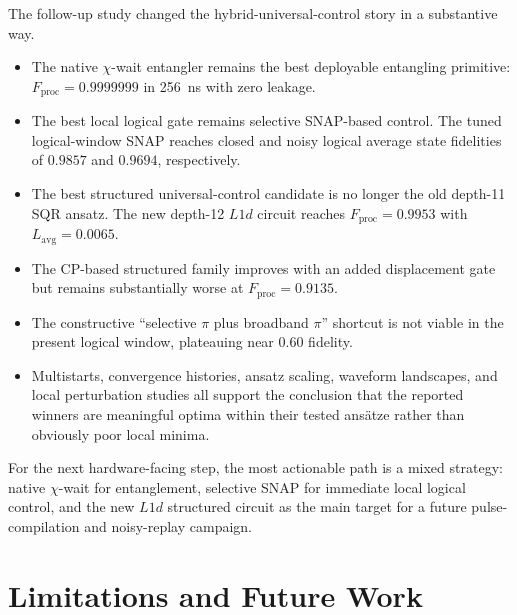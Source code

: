 \documentclass[11pt, a4paper]{article}
\begin{document}
The follow-up study changed the hybrid-universal-control story in a substantive way.
\begin{itemize}
\item The native $\chi$-wait entangler remains the best deployable entangling primitive: $F_{\mathrm{proc}} = 0.9999999$ in \SI{256}{ns} with zero leakage.
\item The best local logical gate remains selective SNAP-based control. The tuned logical-window SNAP reaches closed and noisy logical average state fidelities of $0.9857$ and $0.9694$, respectively.
\item The best structured universal-control candidate is no longer the old depth-11 SQR ansatz. The new depth-12 $L1d$ circuit reaches $F_{\mathrm{proc}} = 0.9953$ with $L_{\mathrm{avg}} = 0.0065$.
\item The CP-based structured family improves with an added displacement gate but remains substantially worse at $F_{\mathrm{proc}} = 0.9135$.
\item The constructive ``selective $\pi$ plus broadband $\pi$'' shortcut is not viable in the present logical window, plateauing near $0.60$ fidelity.
\item Multistarts, convergence histories, ansatz scaling, waveform landscapes, and local perturbation studies all support the conclusion that the reported winners are meaningful optima within their tested ans\"atze rather than obviously poor local minima.
\end{itemize}

For the next hardware-facing step, the most actionable path is a mixed strategy: native $\chi$-wait for entanglement, selective SNAP for immediate local logical control, and the new $L1d$ structured circuit as the main target for a future pulse-compilation and noisy-replay campaign.

\section{Limitations and Future Work}
\label{sec:limitations}
\end{document}
